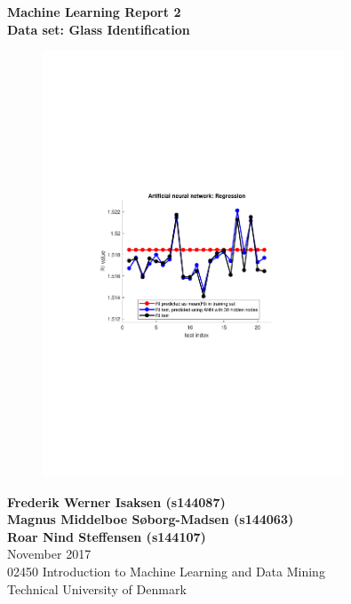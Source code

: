 

\begin{titlepage}
    \begin{center}
        \vspace*{1cm}
        
        \Huge
        \vspace{0.5cm}
        \textbf{Machine Learning Report 2\\
        Data set: Glass Identification}

        \vspace{1cm}
        
        \begin{figure}[H]
        \centering
        \includegraphics[width=0.8\textwidth]{fig/regression/ANN_reg_evaluating_best_model_rbk_frontpage.pdf}
        \end{figure}
 
        \vspace{1cm}
        \Large
        \textbf{Frederik Werner Isaksen (s144087) \\
                Magnus Middelboe Søborg-Madsen (s144063) \\
                Roar Nind Steffensen (s144107)} \\
        
        \vfill
        \vspace{0.8cm}
        \Large
        November 2017\\
        02450 Introduction to Machine Learning and Data Mining\\
        Technical University of Denmark\\
        \vspace*{0.8cm}
    \end{center}
\end{titlepage}

